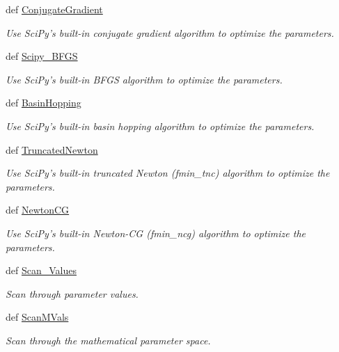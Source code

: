 \begin{DoxyCompactItemize}
def \hyperlink{classforcebalance_1_1optimizer_1_1Optimizer_ad1e151204a172a4e75737b2b699d1623}{Conjugate\-Gradient}
\begin{DoxyCompactList}\small\item\em Use Sci\-Py's built-\/in conjugate gradient algorithm to optimize the parameters. \end{DoxyCompactList}\item 
def \hyperlink{classforcebalance_1_1optimizer_1_1Optimizer_a5461b49efb89fd7d378ab67527e8a66d}{Scipy\-\_\-\-B\-F\-G\-S}
\begin{DoxyCompactList}\small\item\em Use Sci\-Py's built-\/in B\-F\-G\-S algorithm to optimize the parameters. \end{DoxyCompactList}\item 
def \hyperlink{classforcebalance_1_1optimizer_1_1Optimizer_af3a3e5533273fabf7686fbcf13be87e5}{Basin\-Hopping}
\begin{DoxyCompactList}\small\item\em Use Sci\-Py's built-\/in basin hopping algorithm to optimize the parameters. \end{DoxyCompactList}\item 
def \hyperlink{classforcebalance_1_1optimizer_1_1Optimizer_a43f197b0c00976c2116f573fdc559a1c}{Truncated\-Newton}
\begin{DoxyCompactList}\small\item\em Use Sci\-Py's built-\/in truncated Newton (fmin\-\_\-tnc) algorithm to optimize the parameters. \end{DoxyCompactList}\item 
def \hyperlink{classforcebalance_1_1optimizer_1_1Optimizer_afd0d62975b7b895e0e6d672f65beeb81}{Newton\-C\-G}
\begin{DoxyCompactList}\small\item\em Use Sci\-Py's built-\/in Newton-\/\-C\-G (fmin\-\_\-ncg) algorithm to optimize the parameters. \end{DoxyCompactList}\item 
def \hyperlink{classforcebalance_1_1optimizer_1_1Optimizer_a6c7508252398ff7e00469c4c8acb0a48}{Scan\-\_\-\-Values}
\begin{DoxyCompactList}\small\item\em Scan through parameter values. \end{DoxyCompactList}\item 
def \hyperlink{classforcebalance_1_1optimizer_1_1Optimizer_a43ab8c6bea2b3112468922ab61163f67}{Scan\-M\-Vals}
\begin{DoxyCompactList}\small\item\em Scan through the mathematical parameter space. \end{DoxyCompactList}\item 

\end{DoxyCompactItemize}
